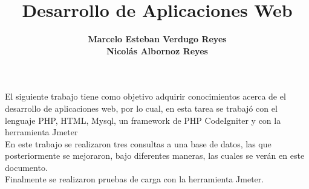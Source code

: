 \documentclass[12pt,letterpaper]{report}
\begin{document}
\title{\textbf{Desarrollo de Aplicaciones Web}}
\author{\textbf{Marcelo Esteban Verdugo Reyes \\ Nicolás Albornoz Reyes}}

\beforepreface
{}
El siguiente trabajo tiene como objetivo adquirir conocimientos acerca de el desarrollo de aplicaciones web, por lo cual, en esta tarea se trabajó con el lenguaje PHP, HTML, Mysql, un framework de PHP CodeIgniter y con la herramienta Jmeter \\
En este trabajo se realizaron tres consultas a una base de datos, las que posteriormente se mejoraron, bajo diferentes maneras, las cuales se verán en este documento. \\ 
Finalmente se realizaron pruebas de carga con la herramienta Jmeter.


\renewcommand{\thepage}{\roman{page}}
\tableofcontents
\newpage
\listoftables
\listoffigures
\newpage

\renewcommand{\thepage}{\arabic{page}}





\end{document}
